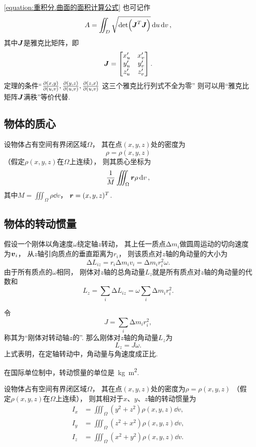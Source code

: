 \cref{equation:重积分.曲面的面积计算公式} 也可记作\[
	A = \iint_D \sqrt{\det(\boldsymbol{J}^T \boldsymbol{J})} \dd{u}\dd{v},
\]
其中\(\boldsymbol{J}\)是雅克比矩阵，即\[
	\boldsymbol{J} = \begin{bmatrix}
		x'_u & x'_v \\
		y'_u & y'_v \\
		z'_u & z'_v
	\end{bmatrix}.
\]
定理的条件“\(\pdv{ (x,y) }{ (u,v) },
\pdv{ (y,z) }{ (u,v) },
\pdv{ (z,x) }{ (u,v) }\)
这三个雅克比行列式不全为零”
则可以用“雅克比矩阵\(\boldsymbol{J}\)满秩”等价代替.

\subsection{物体的质心}
\begin{theorem}
设物体占有空间有界闭区域\(\Omega\)，
其在点\((x,y,z)\)处的密度为\[
	\rho=\rho(x,y,z)
\]
（假定\(\rho(x,y,z)\)在\(\Omega\)上连续），
则其质心坐标为\begin{equation}
	\frac{1}{M} \iiint_\Omega \boldsymbol{r} \rho \dd{v},
\end{equation}
其中\(M = \iiint_\Omega \rho \dd{v}\)，
\(\boldsymbol{r} = (x,y,z)^T\).
\end{theorem}

\subsection{物体的转动惯量}
假设一个刚体以角速度\(\omega\)绕定轴\(z\)转动，
其上任一质点\(\increment m_i\)做圆周运动的切向速度为\(\boldsymbol{v}_i\)，
从\(z\)轴引向质点的垂直距离为\(r_i\)，
则该质点对\(z\)轴的角动量的大小为\[
	\increment L_{iz}
	= r_i \increment m_i v_i
	= \increment m_i r_i^2 \omega.
\]
由于所有质点的\(\omega\)相同，
刚体对\(z\)轴的总角动量\(L_z\)就是所有质点对\(z\)轴的角动量的代数和\[
	L_z = \sum_i \increment L_{iz}
	= \omega \sum_i \increment m_i r_i^2.
\]

令\[
	J = \sum_i \increment m_i r_i^2,
\]
称其为“刚体对转动轴\(z\)的”.
那么刚体对\(z\)轴的角动量\(L_z\)为\[
	L_z = J \omega.
\]
上式表明，在定轴转动中，角动量与角速度成正比.

在国际单位制中，转动惯量的单位是~\unit{\kilo\gram.\square\meter}.

\begin{theorem}
设物体占有空间有界闭区域\(\Omega\)，
其在点\((x,y,z)\)处的密度为\(\rho=\rho(x,y,z)\)
（假定\(\rho(x,y,z)\)在\(\Omega\)上连续），
则其相对于\(x\)、\(y\)、\(z\)轴的转动惯量为\begin{align}
	I_x &= \iiint_\Omega (y^2+z^2) \rho(x,y,z) \dd{v}, \\
	I_y &= \iiint_\Omega (z^2+x^2) \rho(x,y,z) \dd{v}, \\
	I_z &= \iiint_\Omega (x^2+y^2) \rho(x,y,z) \dd{v}.
\end{align}
\end{theorem}

